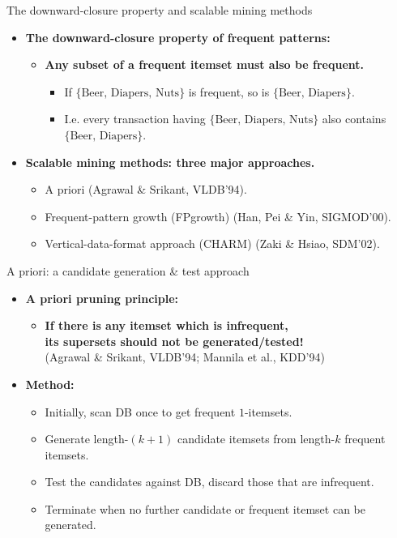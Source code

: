 \documentclass[aspectratio=169,t,xcolor=dvipsnames]{beamer}
\begin{document}
  {
    \begin{frame}{The downward-closure property and scalable mining methods}
    \begin{itemize}
      \item \textbf{The downward-closure property of frequent patterns:}
      \begin{itemize}
        \item \textbf{\color{airforceblue}Any subset of a frequent itemset must also be frequent.}
        \begin{itemize}
          \item If $\{\text{Beer, Diapers, Nuts}\}$ is frequent, so is $\{\text{Beer, Diapers}\}$.
          \item I.e. every transaction having $\{\text{Beer, Diapers, Nuts}\}$ also contains $\{\text{Beer, Diapers}\}$.
        \end{itemize}
      \end{itemize}
      \item \textbf{Scalable mining methods: three major approaches.}
      \begin{itemize}
        \item A priori (Agrawal \& Srikant, VLDB'94).
        \item Frequent-pattern growth (FPgrowth) (Han, Pei \& Yin, SIGMOD'00).
        \item Vertical-data-format approach (CHARM) (Zaki \& Hsiao, SDM'02).
      \end{itemize}
    \end{itemize}
    \end{frame}
  }

  {
    \begin{frame}{A priori: a candidate generation \& test approach}
    \begin{itemize}
      \item \textbf{A priori pruning principle:}
      \begin{itemize}
        \item \textbf{\color{airforceblue}If there is any itemset which is infrequent, \\ its supersets should not be generated/tested!} \\ (Agrawal \& Srikant, VLDB'94; Mannila et al., KDD'94)
      \end{itemize}
      \item \textbf{Method:}
      \begin{itemize}
        \item Initially, scan DB once to get frequent $1$-itemsets.
        \item Generate length-$(k+1)$ candidate itemsets from length-$k$ frequent itemsets.
        \item Test the candidates against DB, discard those that are infrequent.
        \item Terminate when no further candidate or frequent itemset can be generated.
      \end{itemize}
    \end{itemize}
    \end{frame}
  }
\end{document}
